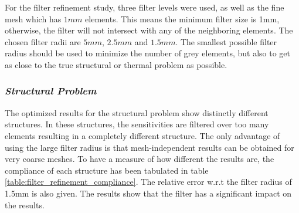 For the filter refinement study, three filter levels were used, as well as the fine mesh which has $1mm$ elements. This means the minimum filter size is 1mm, otherwise, the filter will not intersect with any of the neighboring elements. The chosen filter radii are $5mm$, $2.5mm$ and $1.5mm$. The smallest possible filter radius should be used to minimize the number of grey elements, but also to get as close to the true structural or thermal problem as possible.

\subsubsection*{\emph{Structural Problem}}
The optimized results for the structural problem show distinctly different structures. In these structures, the sensitivities are filtered over too many elements resulting in a completely different structure. The only advantage of using the large filter radius is that mesh-independent results can be obtained for very coarse meshes. To have a measure of how different the results are, the compliance of each structure has been tabulated in table \ref{table:filter_refinement_compliance}. The relative error w.r.t the filter radius of 1.5mm is also given. The results show that the filter has a significant impact on the results.
